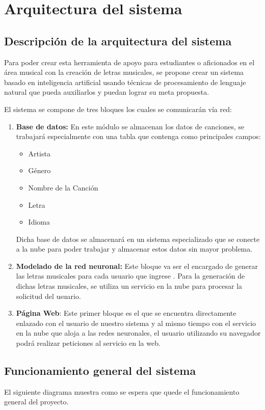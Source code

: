 \documentclass[12pt, a4paper, titlepage]{report}
\begin{document}
\section{Arquitectura del sistema}
		\subsection{Descripción de la arquitectura del sistema}
		Para poder crear esta herramienta de apoyo para estudiantes o aficionados en el área musical con la creación de letras musicales, se propone crear un sistema basado en inteligencia artificial usando técnicas de procesamiento de lenguaje natural que pueda auxiliarlos y puedan lograr su meta propuesta.
		
		El sistema se compone de tres bloques los cuales se comunicarán vía red:
		\begin{enumerate}
			\item \textbf{Base de datos:} En este módulo se almacenan los datos de canciones, se trabajará especialmente con una tabla que contenga como principales campos:
			\begin{itemize}
				\item Artista
				\item Género
				\item Nombre de la Canción
				\item Letra
				\item Idioma
			\end{itemize}
			Dicha base de datos se almacenará en un sistema especializado que se conecte a la nube para poder trabajar y almacenar estos datos sin mayor problema.
			\item \textbf{Modelado de la red neuronal:} Este bloque va ser el encargado de generar las letras musicales para cada usuario que ingrese . Para la generación de dichas letras musicales, se utiliza un servicio en la nube para procesar la solicitud del usuario. 
			\item \textbf{Página Web}: Este primer bloque es el que se encuentra directamente enlazado con el usuario de nuestro sistema y al mismo tiempo con el servicio en la nube que aloja a las redes neuronales, el usuario utilizando su navegador podrá realizar peticiones al servicio en la web.
		\end{enumerate}
	
		\subsection{Funcionamiento general del sistema}
		El siguiente diagrama muestra como se espera que quede el funcionamiento general del proyecto.
	
\end{document}
